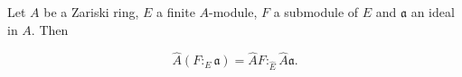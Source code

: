 Let $A$ be a Zariski ring, $E$ a finite $A$-module, $F$ a submodule of $E$ and $\mathfrak{a}$ an ideal in $A$. Then

$$\hat{A}(F :_E \mathfrak{a}) = \hat{A}F :_{\hat{E}} \hat{A}\mathfrak{a}.$$
